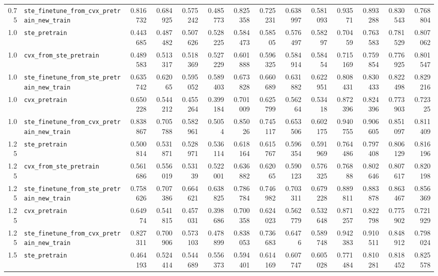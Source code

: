 \begin{longtable}{@{}r l *{12}{r}@{}}
0.75 & \texttt{ste\_finetune\_from\_cvx\_pretrain\_new\_train} & 0.816732 & 0.684925 & 0.575242 & 0.485773 & 0.825358 & 0.725231 & 0.638997 & 0.581093 & 0.93571 & 0.893288 & 0.830543 & 0.768804 \\
1.0 & \texttt{ste\_pretrain} & 0.443685 & 0.487482 & 0.507626 & 0.528225 & 0.584473 & 0.58505 & 0.576497 & 0.58297 & 0.70459 & 0.763583 & 0.781529 & 0.807062 \\
1.0 & \texttt{cvx\_from\_ste\_pretrain} & 0.489583 & 0.513317 & 0.518369 & 0.527229 & 0.601888 & 0.596325 & 0.584914 & 0.58454 & 0.715169 & 0.759854 & 0.776925 & 0.801547 \\
1.0 & \texttt{ste\_finetune\_from\_ste\_pretrain\_new\_train} & 0.635742 & 0.62065 & 0.595052 & 0.589403 & 0.673828 & 0.660689 & 0.631882 & 0.622951 & 0.808431 & 0.830433 & 0.822498 & 0.829216 \\
1.0 & \texttt{cvx\_pretrain} & 0.650228 & 0.544212 & 0.455264 & 0.399184 & 0.701009 & 0.625799 & 0.56264 & 0.53418 & 0.872396 & 0.824396 & 0.773903 & 0.72325 \\
1.0 & \texttt{ste\_finetune\_from\_cvx\_pretrain\_new\_train} & 0.838867 & 0.705788 & 0.582961 & 0.5054 & 0.85026 & 0.745117 & 0.653506 & 0.602175 & 0.940755 & 0.906605 & 0.851097 & 0.811409 \\
1.25 & \texttt{ste\_pretrain} & 0.500814 & 0.531871 & 0.528971 & 0.536114 & 0.618164 & 0.615767 & 0.596354 & 0.591969 & 0.764486 & 0.797408 & 0.806129 & 0.816196 \\
1.25 & \texttt{cvx\_from\_ste\_pretrain} & 0.561686 & 0.556019 & 0.53139 & 0.522001 & 0.636882 & 0.62065 & 0.590123 & 0.576325 & 0.76888 & 0.802646 & 0.807617 & 0.820198 \\
1.25 & \texttt{ste\_finetune\_from\_ste\_pretrain\_new\_train} & 0.758626 & 0.707386 & 0.664621 & 0.638825 & 0.786784 & 0.746982 & 0.703311 & 0.679228 & 0.889811 & 0.883878 & 0.863467 & 0.856369 \\
1.25 & \texttt{cvx\_pretrain} & 0.64974 & 0.541815 & 0.457031 & 0.398686 & 0.700358 & 0.624023 & 0.562779 & 0.532648 & 0.871257 & 0.822798 & 0.775902 & 0.721929 \\
1.25 & \texttt{ste\_finetune\_from\_cvx\_pretrain\_new\_train} & 0.827311 & 0.700906 & 0.573103 & 0.478899 & 0.838053 & 0.736683 & 0.6476 & 0.589748 & 0.942383 & 0.910511 & 0.848912 & 0.798024 \\
1.5 & \texttt{ste\_pretrain} & 0.464193 & 0.524414 & 0.544689 & 0.556373 & 0.594401 & 0.614169 & 0.607747 & 0.605028 & 0.771484 & 0.810281 & 0.818452 & 0.825578 \\

\end{longtable}
